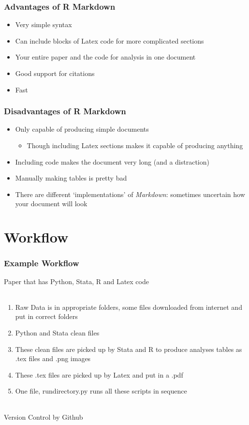 \documentclass{beamer}
\begin{document}
\begin{frame}[t]\frametitle{Advantages of R Markdown}
	\begin{itemize}
		\item Very simple syntax
		\item Can include blocks of Latex code for more complicated sections
		\item Your entire paper and the code for analysis in one document
		\item Good support for citations
		\item Fast
	\end{itemize}
\end{frame}

\begin{frame}[t]\frametitle{Disadvantages of R Markdown}
	\begin{itemize}
		\item Only capable of producing simple documents
		\begin{itemize}
			\item Though including Latex sections makes it capable of producing anything
		\end{itemize}
		\item Including code makes the document very long (and a distraction)
		\item Manually making tables is pretty bad
		\item There are different `implementations' of \textit{Markdown}: sometimes uncertain how your document will look
	\end{itemize}
\end{frame}

\section{Workflow}

\begin{frame}[t]\frametitle{Example Workflow}
	Paper that has Python, Stata, R and Latex code \\~\\
	\begin{enumerate}
		\item Raw Data is in appropriate folders, some files downloaded from internet and put in correct folders
		\item Python and Stata clean files
		\item These clean files are picked up by Stata and R to produce analyses tables as .tex files and .png images
		\item These .tex files are picked up by Latex and put in a .pdf
		\item One file, rundirectory.py runs all these scripts in sequence \\~\\
	\end{enumerate}
	Version Control by Github
\end{frame}
\end{document}
